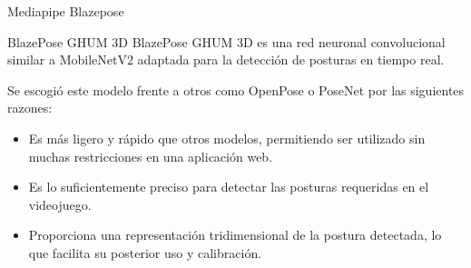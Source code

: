 \begin{frame}{Mediapipe Blazepose}
    \begin{block}{BlazePose GHUM 3D}
        BlazePose GHUM 3D es una red neuronal convolucional similar a
        MobileNetV2 adaptada para la detección de posturas en tiempo real.
    \end{block}

    \small
    Se escogió este modelo frente a otros como OpenPose o PoseNet por las siguientes razones:
    \begin{itemize}
        \item Es más ligero y rápido que otros modelos, permitiendo ser
        utilizado sin muchas restricciones en una aplicación web.

        \item Es lo suficientemente preciso para detectar las posturas
        requeridas en el videojuego.

        \item Proporciona una representación tridimensional de la postura
        detectada, lo que facilita su posterior uso y calibración.
    \end{itemize}
\end{frame}


